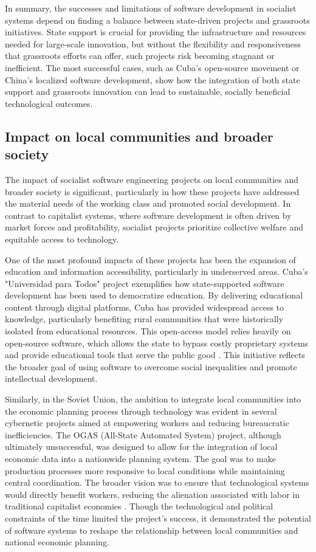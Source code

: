 \begin{refsection}
In summary, the successes and limitations of software development in socialist systems depend on finding a balance between state-driven projects and grassroots initiatives. State support is crucial for providing the infrastructure and resources needed for large-scale innovation, but without the flexibility and responsiveness that grassroots efforts can offer, such projects risk becoming stagnant or inefficient. The most successful cases, such as Cuba’s open-source movement or China’s localized software development, show how the integration of both state support and grassroots innovation can lead to sustainable, socially beneficial technological outcomes.

\subsection{Impact on local communities and broader society}

The impact of socialist software engineering projects on local communities and broader society is significant, particularly in how these projects have addressed the material needs of the working class and promoted social development. In contrast to capitalist systems, where software development is often driven by market forces and profitability, socialist projects prioritize collective welfare and equitable access to technology.

One of the most profound impacts of these projects has been the expansion of education and information accessibility, particularly in underserved areas. Cuba's "Universidad para Todos" project exemplifies how state-supported software development has been used to democratize education. By delivering educational content through digital platforms, Cuba has provided widespread access to knowledge, particularly benefiting rural communities that were historically isolated from educational resources. This open-access model relies heavily on open-source software, which allows the state to bypass costly proprietary systems and provide educational tools that serve the public good \cite[pp.~65-67]{kapcia2008}. This initiative reflects the broader goal of using software to overcome social inequalities and promote intellectual development.

Similarly, in the Soviet Union, the ambition to integrate local communities into the economic planning process through technology was evident in several cybernetic projects aimed at empowering workers and reducing bureaucratic inefficiencies. The OGAS (All-State Automated System) project, although ultimately unsuccessful, was designed to allow for the integration of local economic data into a nationwide planning system. The goal was to make production processes more responsive to local conditions while maintaining central coordination. The broader vision was to ensure that technological systems would directly benefit workers, reducing the alienation associated with labor in traditional capitalist economies \cite[pp.~135-140]{gerovitch2004}. Though the technological and political constraints of the time limited the project’s success, it demonstrated the potential of software systems to reshape the relationship between local communities and national economic planning.


\end{refsection}
